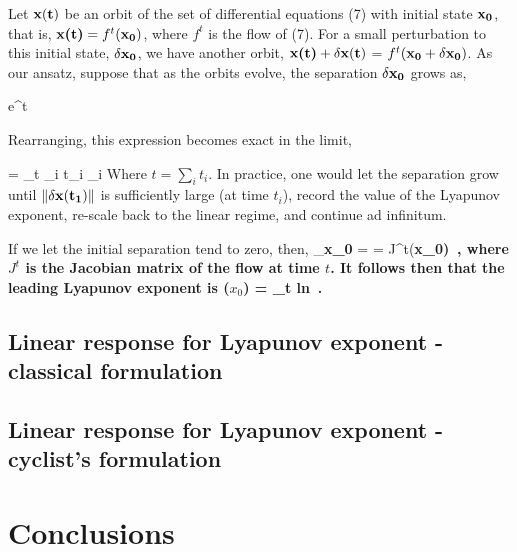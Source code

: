 \documentclass[aps,pre,
                showpacs,
                twocolumn,
                groupedaddress,
                floatfix]{revtex4-1}
\begin{document}
Let $\bf x(t)$ be an orbit of the set of differential equations (7) with
initial state $\bf x_{0}$, that is, $\textbf{x(t)} = f^{t}(\textbf{$\bf
x_0$})$, where $f^t$ is the flow of (7). For a small perturbation to this
initial state, $\bf \delta x_{0}$, we have another orbit, $\textbf{x(t)}
+ \textbf{$\bf \delta x(t)$}$ = $f^{t}(\textbf{$\bf x_{0}$} +
\textbf{$\bf \delta x_{0}$})$. As our ansatz, suppose that as the orbits
evolve, the separation $\bf \delta x_{0}$ grows as,

\beq
e^{\lambda t} \approx \left\Vert {} \right\Vert
\eeq

Rearranging, this expression becomes exact in the limit,

\beq
\lambda = \lim_{t\rightarrow \inf}  \sum_{i} t_{i} \lambda_{i}
\eeq
Where $t = \sum_{i} t_{i}$. In practice, one would let the separation
grow until $\Vert \bf \delta x(t_{1}) \Vert$ is sufficiently large (at
time $t_{i}$), record the value of the Lyapunov exponent, re-scale back
to the linear regime, and continue ad infinitum.

If we let the initial separation tend to zero, then,
\beq
\lim_{\bf \delta x_{0} }  =  = J^{t}(\bf x_{0})
\,,
\eeq
where $J^{t}$ is the Jacobian matrix of the flow at time $t$. It follows
then that the leading Lyapunov exponent is
\beq
\lambda(\textbf{$x_{0}$}) = \lim_{t\rightarrow \inf} ln 
\,.
\eeq

\subsection{Linear response for Lyapunov exponent - classical formulation}
\label{sect:LinrespLyapClass}

\subsection{Linear response for Lyapunov exponent - cyclist's formulation}
\label{sect:LinrespLyapCycl}

\section{Conclusions}
\label{sect:concl}
\end{document}
